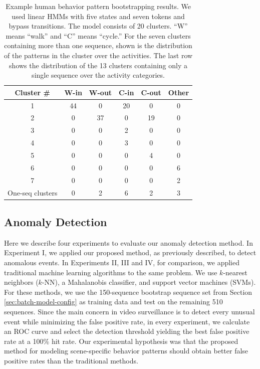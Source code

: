 \begin{table}[t]
  \caption[Example human behavior pattern bootstrapping
    results.]{\small Example human behavior pattern bootstrapping
    results. We used linear HMMs with five states and seven
    tokens and bypass transitions. The model consists of 20 clusters. 
    ``W'' means ``walk''
    and ``C'' means ``cycle.''  For the seven clusters containing more
    than one sequence, shown is the distribution of the patterns in
    the cluster over the activities.  The last row shows the
    distribution of the 13 clusters containing only a single sequence
    over the activity categories.}
  \begin{center}
    \begin{tabular}{c|c|c|c|c|c}
      \hline
      Cluster \# & W-in & W-out & C-in & C-out & Other \\
      \hline \hline
      1 & 44 & 0 & 20 & 0 & 0 \\ \hline
      2 & 0 & 37 & 0 & 19 & 0 \\ \hline
      3 & 0 & 0 & 2 & 0 & 0 \\ \hline
      4 & 0 & 0 & 3 & 0 & 0 \\ \hline
      5 & 0 & 0 & 0 & 4 & 0 \\ \hline
      6 & 0 & 0 & 0 & 0 & 6 \\ \hline
      7 & 0 & 0 & 0 & 0 & 2 \\ \hline
      One-seq clusters & 0 & 2 & 6 & 2 & 3 \\ \hline
    \end{tabular}
  \end{center}
  \label{tab:batch-bootstrapping-results}
\end{table}

\subsection{Anomaly Detection}

Here we describe four experiments to evaluate our anomaly detection
method. In Experiment I, we applied our proposed method, as previously
described, to detect anomalous events. In Experiments II, III and IV,
for comparison, we applied traditional machine learning algorithms to
the same problem. We use $k$-nearest neighbors ($k$-NN), a Mahalanobis 
classifier, and support vector machines (SVMs).  For
these methods, we use the 150-sequence bootstrap sequence set from
Section \ref{sec:batch-model-config} as training data and test on the
remaining 510 sequences.  Since the main concern in video surveillance
is to detect every unusual event while minimizing the false positive
rate, in every experiment, we calculate an ROC curve and select the
detection threshold yielding the best false positive rate at a 100\%
hit rate. Our experimental hypothesis was that the proposed method for
modeling scene-specific behavior patterns should obtain better false
positive rates than the traditional methods.

